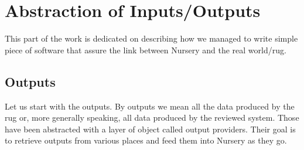 \documentclass[12pt]{article}
\theoremstyle{definition}
\theoremstyle{definition}
\theoremstyle{remark}
\begin{document}
\appendix


\clearpage
\section{Abstraction of Inputs/Outputs}

This part of the work is dedicated on describing how we managed to write simple piece of software that assure the link between Nursery and the real world/\gls{rug}.




\subsection{Outputs}

Let us start with the outputs. By outputs we mean all the data produced by the \gls{rug} or, more generally speaking, all data produced by the reviewed system. Those have been abstracted with a layer of object called output providers. Their goal is to retrieve outputs from various places and feed them into Nursery as they go.\\
\end{document}
